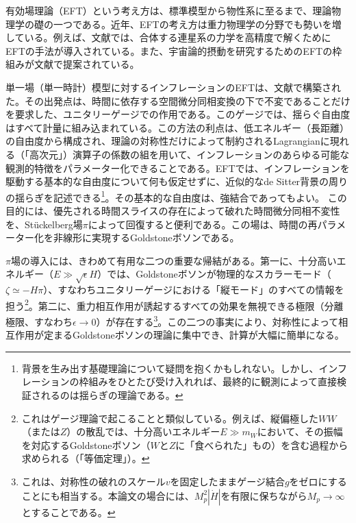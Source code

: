 \label{warm}

有効場理論（EFT）という考え方は、標準模型から物性系に至るまで、理論物理学の礎の一つである\cite{iraeft,joeeft}。近年、EFTの考え方は重力物理学の分野でも勢いを増している。例えば、文献\cite{nrgr1,nrgr1p,radgo}では、合体する連星系の力学を高精度で解くためにEFTの手法が導入されている\cite{nrgr2,nrgr2p,nrgr2p2,andi,foffa,eftrev}。また、宇宙論的摂動を研究するためのEFTの枠組みが文献\cite{eftfluid}で提案されている。

単一場（単一時計）模型に対するインフレーションのEFTは、文献\cite{eft1, Cheung:2007sv, Senatore:2009gt, Senatore:2009cf, Senatore:2010jy, Creminelli:2006xe, Bartolo:2010bj, Bartolo:2010di,dan2,strongc,dan2new}で構築された。その出発点は、時間に依存する空間微分同相変換の下で不変であることだけを要求した、ユニタリーゲージでの作用である。このゲージでは、揺らぐ自由度はすべて計量に組み込まれている。この方法の利点は、低エネルギー（長距離）の自由度から構成され、理論の対称性だけによって制約されるLagrangianに現れる（「高次元」）演算子の係数の組を用いて、インフレーションのあらゆる可能な観測的特徴をパラメーター化できることである。EFTでは、インフレーションを駆動する基本的な自由度について何も仮定せずに、近似的なde Sitter背景の周りの揺らぎを記述できる\footnote{背景を生み出す基礎理論について疑問を抱くかもしれない。しかし、インフレーションの枠組みをひとたび受け入れれば、最終的に観測によって直接検証されるのは揺らぎの理論である。}。その基本的な自由度は、強結合であってもよい。
この目的には、優先される時間スライスの存在によって破れた時間微分同相不変性を、St\"uckelberg場$\pi$によって回復すると便利である。この場は、時間の再パラメーター化を非線形に実現するGoldstoneボソンである。

$\pi$場の導入には、きわめて有用な二つの重要な帰結がある。第一に、十分高いエネルギー（$E \gg \sqrt{\epsilon} H$）では、Goldstoneボソンが物理的なスカラーモード（$\zeta\simeq-H\pi$）、すなわちユニタリーゲージにおける「縦モード」のすべての情報を担う\footnote{これはゲージ理論で起こることと類似している。例えば、縦偏極した$WW$（または$Z$）の散乱では、十分高いエネルギー$E \gg m_W$において、その振幅を対応するGoldstoneボソン（$W$と$Z$に「食べられた」もの）を含む過程から求められる（「等価定理」）\cite{peskin, ben}。}。第二に、重力相互作用が誘起するすべての効果を無視できる極限（分離極限、すなわち$\epsilon \to 0$）が存在する\footnote{これは、対称性の破れのスケール$v$を固定したままゲージ結合$g$をゼロにすることにも相当する。本論文の場合には、$M_p^2|\dot H|$を有限に保ちながら$M_p\to \infty$とすることである。}。この二つの事実により、対称性によって相互作用が定まるGoldstoneボソンの理論に集中でき、計算が大幅に簡単になる。

